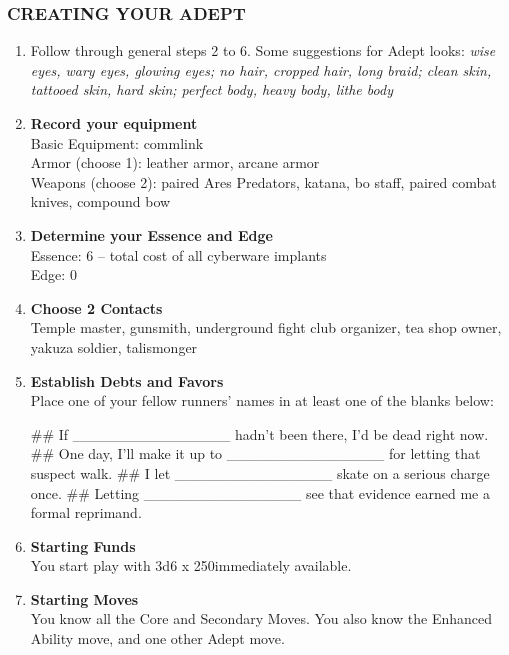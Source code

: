 \subsubsection{CREATING YOUR ADEPT}
\begin{enumerate}
    \item Follow through general steps 2 to 6. Some suggestions for Adept looks: \textit{wise eyes, wary eyes, glowing eyes; no hair, cropped hair, long braid; clean skin, tattooed skin, hard skin; perfect body, heavy body, lithe body}
    
    \item \textbf{Record your equipment} \\
    Basic Equipment: commlink \\
    Armor (choose 1): leather armor, arcane armor \\
    Weapons (choose 2): paired Ares Predators, katana, bo staff, paired combat knives, compound bow
    
    \item \textbf{Determine your Essence and Edge} \\
    Essence: 6 – total cost of all cyberware implants \\
    Edge: 0
    
    \item \textbf{Choose 2 Contacts} \\
    Temple master, gunsmith, underground fight club organizer, tea shop owner, yakuza soldier, talismonger
    
    \item \textbf{Establish Debts and Favors} \\
    Place one of your fellow runners’ names in at least one of the blanks below:
        \begin{easylist}
            ## If \_\_\_\_\_\_\_\_\_\_\_\_\_\_\_ hadn’t been there, I’d be dead right now.
            ## One day, I’ll make it up to \_\_\_\_\_\_\_\_\_\_\_\_\_\_\_ for letting that suspect walk.
            ## I let \_\_\_\_\_\_\_\_\_\_\_\_\_\_\_ skate on a serious charge once. 
            ## Letting \_\_\_\_\_\_\_\_\_\_\_\_\_\_\_ see that evidence earned me a formal reprimand.
        \end{easylist}
    
    \item \textbf{Starting Funds} \\
    You start play with 3d6 x 250\nuyen immediately available.
    
    \item \textbf{Starting Moves} \\
    You know all the Core and Secondary Moves. You also know the Enhanced Ability move, and one other Adept move.
\end{enumerate}


